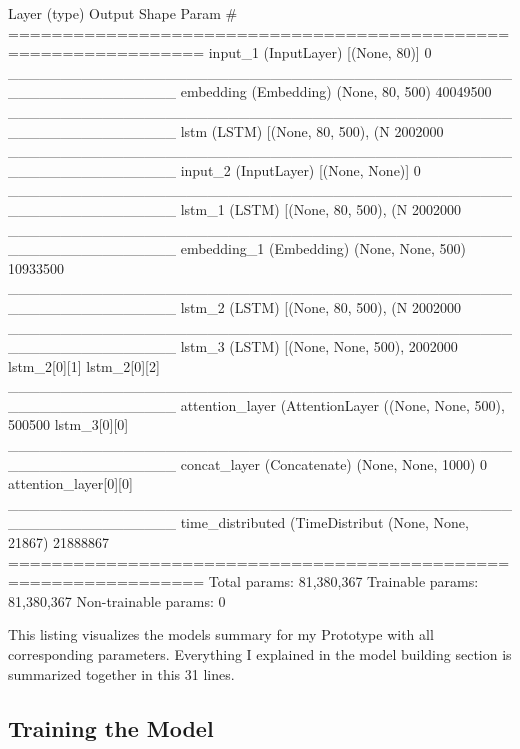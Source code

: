 \begin{python}[caption={Model Summary for my Prototype with corresponding parameters},captionpos=b]
	Layer (type)                    Output Shape         Param #                        
	================================================================
	input_1 (InputLayer)            [(None, 80)]         0                                            
	________________________________________________________________
	embedding (Embedding)           (None, 80, 500)      40049500                     
	________________________________________________________________
	lstm (LSTM)                     [(None, 80, 500), (N 2002000                      
	________________________________________________________________
	input_2 (InputLayer)            [(None, None)]       0                                            
	________________________________________________________________
	lstm_1 (LSTM)                   [(None, 80, 500), (N 2002000                            
	________________________________________________________________
	embedding_1 (Embedding)         (None, None, 500)    10933500                        
	________________________________________________________________
	lstm_2 (LSTM)                   [(None, 80, 500), (N 2002000                 
	________________________________________________________________
	lstm_3 (LSTM)                   [(None, None, 500),  2002000                    
	lstm_2[0][1]                     
	lstm_2[0][2]                     
	________________________________________________________________
	attention_layer (AttentionLayer ((None, None, 500),  500500                          
	lstm_3[0][0]                     
	________________________________________________________________
	concat_layer (Concatenate)      (None, None, 1000)   0                               
	attention_layer[0][0]            
	________________________________________________________________
	time_distributed (TimeDistribut (None, None, 21867)  21888867                 
	================================================================
	Total params: 81,380,367
	Trainable params: 81,380,367
	Non-trainable params: 0
\end{python}

This listing visualizes the models summary for my Prototype with all corresponding parameters. Everything I explained in the model building section is summarized together in this 31 lines.


\subsection{Training the Model}

